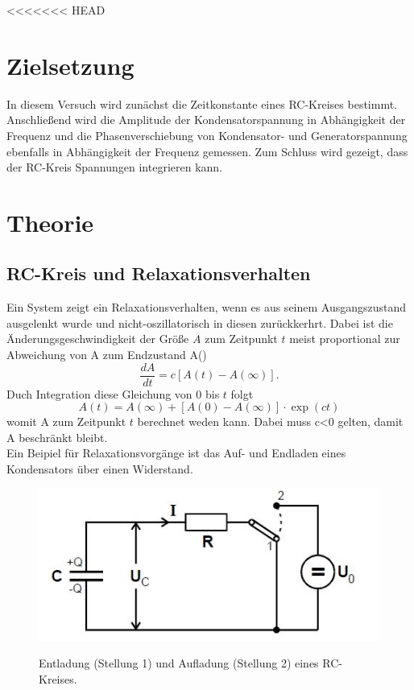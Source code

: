 <<<<<<< HEAD
\section{Zielsetzung}
In diesem Versuch wird zunächst die Zeitkonstante eines RC-Kreises bestimmt.
Anschließend wird die Amplitude der Kondensatorspannung in Abhängigkeit der Frequenz und
die Phasenverschiebung von Kondensator- und Generatorspannung ebenfalls in Abhängigkeit der
Frequenz gemessen. Zum Schluss wird gezeigt, dass der RC-Kreis Spannungen
integrieren kann.

\section{Theorie}
\subsection{RC-Kreis und Relaxationsverhalten}
Ein System zeigt ein Relaxationsverhalten, wenn es aus seinem Ausgangszustand
ausgelenkt wurde und nicht-oszillatorisch in diesen zurückkerhrt. Dabei ist die
Änderungsgeschwindigkeit der Größe $A$ zum Zeitpunkt $t$ meist proportional zur
Abweichung von A zum Endzustand A(\infty)
\begin{equation}
  \frac{dA}{dt} = c[A(t)-A(\infty)].
  \label{eqn:diff1}
\end{equation}
Duch Integration diese Gleichung von 0 bis $t$ folgt
\begin{equation}
  A(t)=A(\infty)+[A(0)-A(\infty)] \cdot \exp{(ct)}
\end{equation}
womit A zum Zeitpunkt $t$ berechnet weden kann.
Dabei muss c<0 gelten, damit A beschränkt bleibt. \\

Ein Beipiel für Relaxationsvorgänge ist das Auf- und Endladen eines Kondensators
über einen Widerstand.
\begin{figure}[H]
  \centering
  \includegraphics[height=5cm]{RC.JPG}
  \cite{skript}
  \caption{Entladung (Stellung 1) und Aufladung (Stellung 2) eines RC-Kreises.}
  \label{fig:RC}
  \end{figure}


